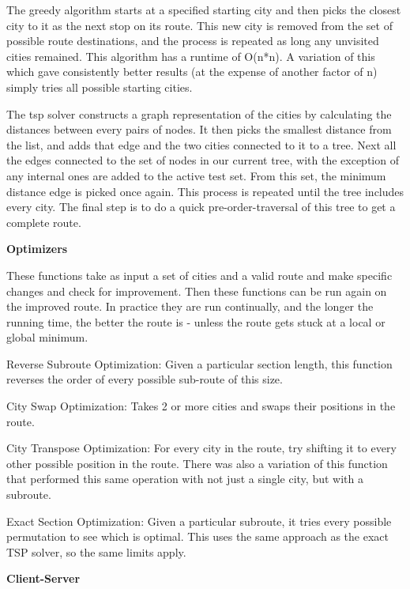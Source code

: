 \documentclass[letterpaper,10pt,titlepage,fleqn]{article}
\begin{document}
The greedy algorithm starts at a specified starting city and then picks the closest city to it as the next stop on its route. This new city is removed from the set of possible route destinations, and the process is repeated as long any unvisited cities remained. This algorithm has a runtime of O(n*n). A variation of this which gave consistently better results (at the expense of another factor of n) simply tries all possible starting cities. 

The tsp solver constructs a graph representation of the cities by calculating the distances between every pairs of nodes. It then picks the smallest distance from the list, and adds that edge and the two cities connected to it to a tree. Next all the edges connected to the set of nodes in our current tree, with the exception of any internal ones are added to the active test set. From this set, the minimum distance edge is picked once again. This process is repeated until the tree includes every city. The final step is to do a quick pre-order-traversal of this tree to get a complete route.

\begin{Large}
\textbf{Optimizers} \\
\end{Large}
These functions take as input a set of cities and a valid route and make specific changes and check for improvement. Then these functions can be run again on the improved route. In practice they are run continually, and the longer the running time, the better the route is - unless the route gets stuck at a local or global minimum.

Reverse Subroute Optimization: Given a particular section length, this function reverses the order of every possible sub-route of this size.

City Swap Optimization: Takes 2 or more cities and swaps their positions in the route. 

City Transpose Optimization: For every city in the route, try shifting it to every other possible position in the route. There was also a variation of this function that performed this same operation with not just a single city, but with a subroute.

Exact Section Optimization: Given a particular subroute, it tries every possible permutation to see which is optimal. This uses the same approach as the exact TSP solver, so the same limits apply. \\

\begin{Large}
\textbf{Client-Server}\\
\end{Large}
\end{document}
